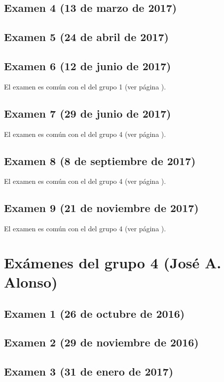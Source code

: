 \documentclass[a4paper,12pt,twoside]{book}
\begin{document}
\subsection{Examen 4 (13 de marzo de 2017)}
\subsection{Examen 5 (24 de abril de 2017)}
\subsection{Examen 6 (12 de junio de 2017)} 
El examen es común con el del grupo 1 (ver página \pageref{examen_16_17_1_6}).
\subsection{Examen 7 (29 de junio de 2017)}
El examen es común con el del grupo 4 (ver página \pageref{examen_16_17_4_7}).
\subsection{Examen 8 (8 de septiembre de 2017)}
El examen es común con el del grupo 4 (ver página \pageref{examen_16_17_4_8}).
\subsection{Examen 9 (21 de noviembre de 2017)}
El examen es común con el del grupo 4 (ver página \pageref{examen_16_17_4_9}).

\section{Exámenes del grupo 4 (José A. Alonso)}
\subsection{Examen 1 (26 de octubre de 2016)}
\subsection{Examen 2 (29 de noviembre de 2016)}
\subsection{Examen 3 (31 de enero de 2017)}
 \label{examen_16_17_4_3}
\end{document}
